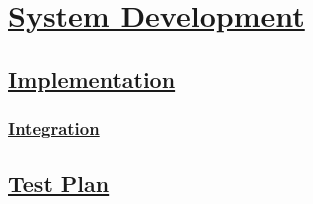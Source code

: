 \section[System Development]{\hyperlink{toc}{System Development}}
	\label{sec:systemDevelopment}
	
	\subsection[Implementation]{\hyperlink{toc}{Implementation}}
		\label{sec:implementation}
		
	\subsubsection[Integration]{\hyperlink{toc}{Integration}}
		\label{sec:integration}
		
	\subsection[Test Plan]{\hyperlink{toc}{Test Plan}}
		\label{sec:testPlan}		